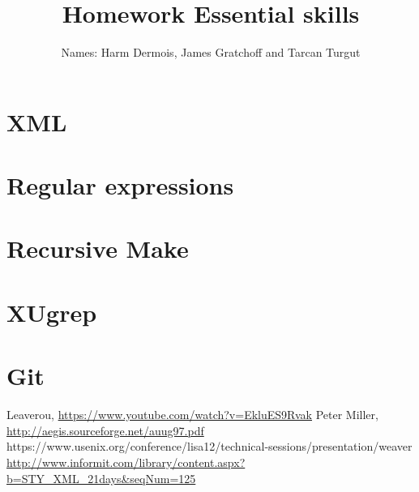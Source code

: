 \documentclass[12pt,a4paper]{article}
\begin{document}
\title{Homework Essential skills}
\author{Names: Harm Dermois, James Gratchoff and Tarcan Turgut }
\date{}
\maketitle

\section{XML}

\section{Regular expressions}

\section{Recursive Make}

\section{XUgrep}

\section{Git}


\begin{thebibliography}{9}
	Leaverou,
	\url{https://www.youtube.com/watch?v=EkluES9Rvak}
	Peter Miller,
	\url{http://aegis.sourceforge.net/auug97.pdf}
	https://www.usenix.org/conference/lisa12/technical-sessions/presentation/weaver
	\url{http://www.informit.com/library/content.aspx?b=STY_XML_21days&seqNum=125}
\end{thebibliography}
\end{document}
